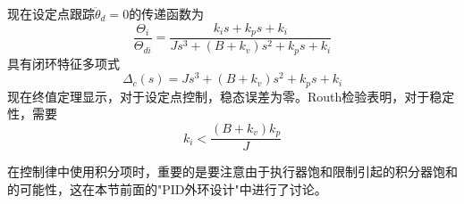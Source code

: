 \documentclass[UTF8]{ctexart}
\theoremstyle{definition}
\begin{document}
现在设定点跟踪$\ddot{\theta}_d = 0$的传递函数为
\begin{equation}
    \frac{\Theta_i}{\Theta_{di}} = \frac{k_is + k_ps + k_i}{Js^3 + (B + k_v)s^2 + k_ps + k_i}
\end{equation}
具有闭环特征多项式
\begin{equation}
    \Delta_c(s) = Js^3 + (B + k_v)s^2 + k_ps + k_i
\end{equation}
现在终值定理显示，对于设定点控制，稳态误差为零。Routh检验表明，对于稳定性，需要
\begin{equation}
    k_i < \frac{(B + k_v)k_p}{J}
\end{equation}

在控制律中使用积分项时，重要的是要注意由于执行器饱和限制引起的积分器饱和的可能性，这在本节前面的"PID外环设计"中进行了讨论。
\end{document}
